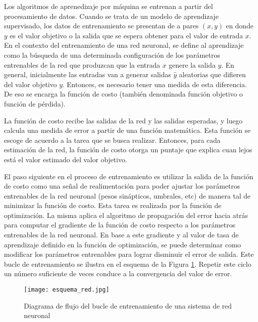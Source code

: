 Los algoritmos de aprenedizaje por máquina se entrenan a partir del procesamiento de datos. Cuando se trata de un modelo de aprendizaje supervisado, los datos de entrenamiento se presentan de a pares $(x,y)$ en donde $y$ es el valor objetivo o la salida que se espera obtener para el valor de entrada $x$. En el contexto del entrenamiento de una red neuronal, se define al aprendizaje como la búsqueda de una determinada configuración de los parámetros entrenables de la red que produzcan que la entrada $x$ genere la salida $y$. En general, inicialmente las entradas van a generar salidas $\hat{y}$ aleatorias que difieren del valor objetivo $y$. Entonces, es necesario tener una medida de esta diferencia. De eso se encarga la función de costo (también denominada función objetivo o función de pérdida).

La función de costo recibe las salidas de la red y las salidas esperadas, y luego calcula una medida de error a partir de una función matemática. Esta función se escoge de acuerdo a la tarea que se busca realizar. Entonces, para cada estimación de la red, la función de costo otorga un puntaje que explica cuan lejos está el valor estimado del valor objetivo.  

El paso siguiente en el proceso de entrenamiento es utilizar la salida de la función de costo como una señal de realimentación para poder ajustar los parámetros entrenables de la red neuronal (pesos sinápticos, umbrales, etc) de manera tal de minimizar la función de costo. Esta tarea es realizada por la función de optimización. La misma aplica el algoritmo de propagación del error hacia atrás para computar el gradiente de la función de costo respecto a los parámetros entrenables de la red neuronal. En base a este gradiente y al valor de tasa de aprendizaje definido en la función de optimización, se puede determinar como modificar los parámetros entrenables para lograr disminuir el error de salida. Este bucle de entrenamiento se ilustra en el esquema de la Figura \ref{fig:esquema}. Repetir este ciclo un número suficiente de veces conduce a la convergencia del valor de error. 

\begin{figure}[H]
  \centering{}
  \texttt{[image: esquema\_red.jpg]}
  \caption{Diagrama de flujo del bucle de entrenamiento de una sistema de red neuronal}
  \label{fig:esquema}
\end{figure}


